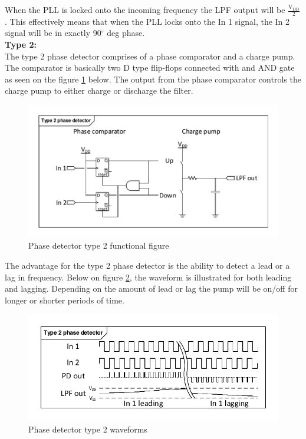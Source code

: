 When the PLL is locked onto the incoming frequency the LPF output will be $\frac{\text{V}_{\text{DD}}}{2}$. This effectively means that when the PLL locks onto the In 1 signal, the In 2 signal will be in exactly 90$^{\circ}$ deg phase.\\
\textbf{Type 2:}\\
The type 2 phase detector comprises of a phase comparator and a charge pump. The comparator is basically two D type flip-flops connected with and AND gate as seen on the figure \ref{fig:pd2_imp} below. The output from the phase comparator controls the charge pump to either charge or discharge the filter.
\begin{figure}[H]
	\centering
	\includegraphics[width=.7\textwidth]{billeder/10technologystudies/pd2_imp}
	\caption{Phase detector type 2 functional figure}
	\label{fig:pd2_imp}
\end{figure}
The advantage for the type 2 phase detector is the ability to detect a lead or a lag in frequency. Below on figure \ref{fig:pd2_waveform}, the waveform is illustrated for both leading and lagging. Depending on the amount of lead or lag the pump will be on/off for longer or shorter periods of time.
\begin{figure}[H]
	\centering
	\includegraphics[width=1\textwidth]{billeder/10technologystudies/pd2_waveform}
	\caption{Phase detector type 2 waveforms}
	\label{fig:pd2_waveform}
\end{figure}
